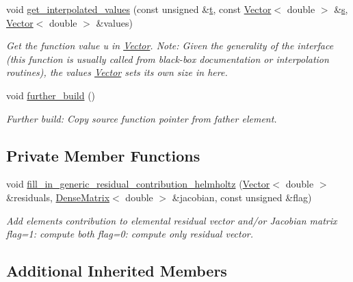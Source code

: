 \begin{DoxyCompactItemize}
void \hyperlink{classoomph_1_1RefineableHelmholtzEquations_aa9296bdeeb5699a279afb3813c81024f}{get\+\_\+interpolated\+\_\+values} (const unsigned \&\hyperlink{cfortran_8h_af6f0bd3dc13317f895c91323c25c2b8f}{t}, const \hyperlink{classoomph_1_1Vector}{Vector}$<$ double $>$ \&\hyperlink{cfortran_8h_ab7123126e4885ef647dd9c6e3807a21c}{s}, \hyperlink{classoomph_1_1Vector}{Vector}$<$ double $>$ \&values)
\begin{DoxyCompactList}\small\item\em Get the function value u in \hyperlink{classoomph_1_1Vector}{Vector}. Note\+: Given the generality of the interface (this function is usually called from black-\/box documentation or interpolation routines), the values \hyperlink{classoomph_1_1Vector}{Vector} sets its own size in here. \end{DoxyCompactList}\item 
void \hyperlink{classoomph_1_1RefineableHelmholtzEquations_a6b58f755f6ab936ab633ecee05998899}{further\+\_\+build} ()
\begin{DoxyCompactList}\small\item\em Further build\+: Copy source function pointer from father element. \end{DoxyCompactList}\end{DoxyCompactItemize}
\subsection*{Private Member Functions}
\begin{DoxyCompactItemize}
\item 
void \hyperlink{classoomph_1_1RefineableHelmholtzEquations_a3762ea1eef3fa5e835686643c25e8cec}{fill\+\_\+in\+\_\+generic\+\_\+residual\+\_\+contribution\+\_\+helmholtz} (\hyperlink{classoomph_1_1Vector}{Vector}$<$ double $>$ \&residuals, \hyperlink{classoomph_1_1DenseMatrix}{Dense\+Matrix}$<$ double $>$ \&jacobian, const unsigned \&flag)
\begin{DoxyCompactList}\small\item\em Add element\textquotesingle{}s contribution to elemental residual vector and/or Jacobian matrix flag=1\+: compute both flag=0\+: compute only residual vector. \end{DoxyCompactList}\end{DoxyCompactItemize}
\subsection*{Additional Inherited Members}


